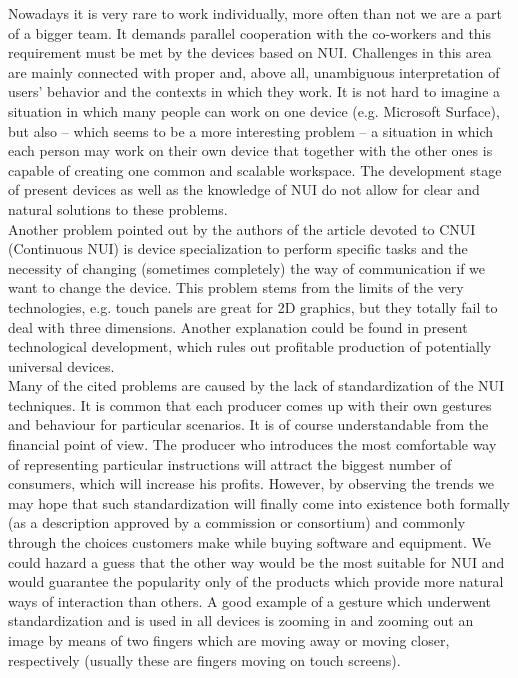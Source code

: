 \documentclass{jacsart}
\begin{document}
\indent Nowadays it is very rare to work individually, more often than not we are a part of a bigger team.  It demands parallel cooperation with the co-workers and this requirement must be met by the devices based on NUI. Challenges in this area are mainly connected with proper and, above all, unambiguous interpretation of users’ behavior and the contexts in which they work.  It is not hard to imagine a situation in which many people can work on one device (e.g. Microsoft Surface), but also – which seems to be a more interesting problem – a situation in which each person may work on their own device that together with the other ones is capable of creating one common and scalable workspace. The development stage of present devices as well as the knowledge of NUI do not allow for clear and natural solutions to these problems.\\
\indent Another problem pointed out by the authors of the article devoted to CNUI (Continuous NUI) \cite{Petersen2009} is device specialization to perform specific tasks and the necessity of changing (sometimes completely) the way of communication if we want to change the device.  This problem stems from the limits of the very technologies, e.g. touch panels are great for 2D graphics, but they totally fail to deal with three dimensions. Another explanation could be found in present technological development, which rules out profitable production of potentially universal devices.\\
\indent Many of the cited problems are caused by the lack of standardization of the NUI techniques. It is common that each producer comes up with their own gestures and behaviour for particular scenarios. It is of course understandable from the financial point of view. The producer who introduces the most comfortable way of representing particular instructions will attract the biggest number of consumers, which will increase his profits. However, by observing the trends we may hope that such standardization will finally come into existence both formally (as a description approved by a commission or consortium) and commonly through the choices customers make while buying software and equipment. We could hazard a guess that the other way would be the most suitable for NUI and would guarantee the popularity only of the products which provide more natural ways of interaction than others. A good example of a gesture which underwent standardization and is used in all devices is zooming in and zooming out an image by means of two fingers which are moving away or moving closer, respectively (usually these are fingers moving on touch screens).\\
\end{document}
